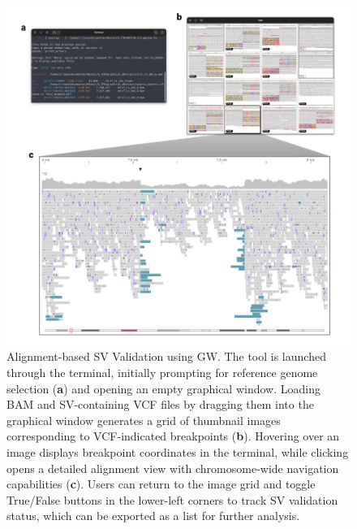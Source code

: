 \begin{figure}[H]
    \centering
    \includegraphics[width=\textwidth]{img/GW_UI.pdf}
    \caption[Alignment-based SV Validation using GW]{Alignment-based SV 
    Validation using GW. The tool is launched through the terminal, initially 
    prompting for reference genome selection (\textbf{a}) and opening an empty graphical
    window. Loading BAM and SV-containing VCF files by dragging them into the 
    graphical window generates a grid of thumbnail images corresponding to 
    VCF-indicated breakpoints (\textbf{b}). Hovering over an image displays breakpoint 
    coordinates in the terminal, while clicking opens a detailed alignment view 
    with chromosome-wide navigation capabilities (\textbf{c}). Users can return to the 
    image grid and toggle True/False buttons in the lower-left corners to track 
    SV validation status, which can be exported as a list for further analysis.}
    \label{fig:GW_UI}
\end{figure}